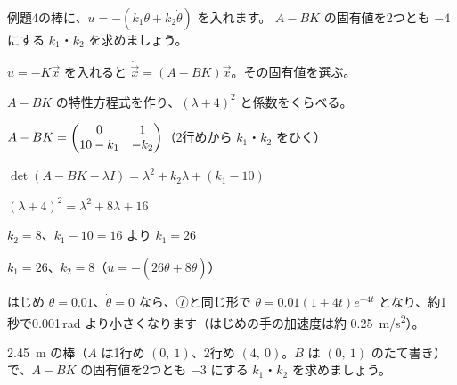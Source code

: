 \begin{reidai}[棒を立たせる $K$]
例題4の棒に、$u=-(k_1\theta+k_2\dot\theta)$ を入れます。
$A-BK$ の固有値を2つとも $-4$ にする $k_1$・$k_2$ を求めましょう。\par
\kangaekata {}\par
{}\enspace $u=-K\vec x$ を入れると $\dot{\vec x}=(A-BK)\vec x$。その固有値を選ぶ。\par
{}\enspace $A-BK$ の特性方程式を作り、$(\lambda+4)^2$ と係数をくらべる。\par
\shiki\kixks{}\zw{} $A-BK=\kixkpm{0&1\\10-k_1&-k_2}$\quad （2行めから $k_1$・$k_2$ をひく）\par
\kixka $\det(A-BK-\lambda I)=\lambda^2+k_2\lambda+(k_1-10)$\par
\kixka $(\lambda+4)^2=\lambda^2+8\lambda+16$\par
\kixka $k_2=8$、$k_1-10=16$ より $k_1=26$\par
\kotae $k_1=26$、$k_2=8$（$u=-(26\theta+8\dot\theta)$）
\end{reidai}

はじめ $\theta=0.01$、$\dot\theta=0$ なら、⑦と同じ形で $\theta=0.01(1+4t)e^{-4t}$ となり、約1秒で0.001\,rad より小さくなります（はじめの手の加速度は約 \qty{0.25}{m/s^2}）。

\begin{jibun}
\qty{2.45}{m} の棒（$A$ は1行め $(0,\ 1)$、2行め $(4,\ 0)$。$B$ は $(0,\ 1)$ のたて書き）で、$A-BK$ の固有値を2つとも $-3$ にする $k_1$・$k_2$ を求めましょう。
\end{jibun}

